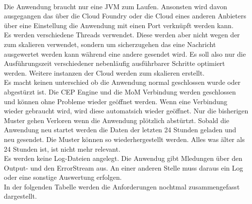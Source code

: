 \\
Die Anwendung braucht nur eine JVM zum Laufen. Ansonsten wird davon ausgegangen das über die Cloud Foundry oder die Cloud eines anderen Anbieters über eine Einstellung die Anwendung mit einen Port verknüpft werden kann. 
\\
Es werden verschiedene Threads verwendet. Diese werden aber nicht wegen der zum skalieren verwendet, sondern um sicherzugehen das eine Nachricht ausgewertet werden kann während eine andere gesendet wird. Es soll also nur die Ausführungszeit verschiedener nebenläufig ausführbarer Schritte optimiert werden. Weitere instanzen der Cloud werden zum skalieren erstellt. 
\\
Es macht keinen unterschied ob die Anwendung normal geschlossen wurde oder abgestürzt ist. Die CEP Engine und die MoM Verbindung werden geschlossen und können ohne Probleme wieder geöffnet werden. Wenn eine Verbindung wieder gebraucht wird, wird diese automatsich wieder geöffnet. Nur die bisherigen Muster gehen Verloren wenn die Anwendung plötzlich abstürtzt. Sobald die Anwendung neu startet werden die Daten der letzten 24 Stunden geladen und neu gesendet. Die Muster können so wiederhergestellt werden. Alles was älter als 24 Stunden ist, ist nicht mehr relevant. 
\\
Es werden keine Log-Dateien angelegt. Die Anwendug gibt Mledungen über den Output- und den ErrorStream aus. An einer anderen Stelle muss daraus ein Log oder eine sonstige Auswertung erfolgen. 
\\
In der folgenden Tabelle werden die Anforderungen nochtmal zusammengefasst dargestellt. 
